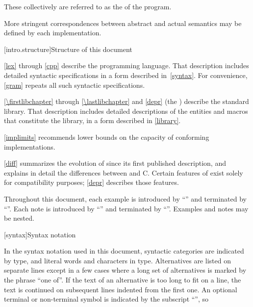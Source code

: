 These collectively are referred to as the
 of the program.
\begin{note} More stringent correspondences between abstract and actual
semantics may be defined by each implementation. \end{note}

[intro.structure]{Structure of this document}

\pnum
{}%
%
\ref{lex} through \ref{cpp} describe the \Cpp{} programming
language. That description includes detailed syntactic specifications in
a form described in~\ref{syntax}. For convenience, \ref{gram}
repeats all such syntactic specifications.

\pnum
\ref{\firstlibchapter} through \ref{\lastlibchapter} and \ref{depr}
(the ) describe the \Cpp{} standard library.
That description includes detailed descriptions of the
entities and macros
that constitute the library, in a form described in \ref{library}.

\pnum
\ref{implimits} recommends lower bounds on the capacity of conforming
implementations.

\pnum
\ref{diff} summarizes the evolution of \Cpp{} since its first
published description, and explains in detail the differences between
\Cpp{} and C\@. Certain features of \Cpp{} exist solely for compatibility
purposes; \ref{depr} describes those features.

\pnum
Throughout this document, each example is introduced by
``'' and terminated by ``''. Each note is
introduced by ``'' and terminated by ``''. Examples
and notes may be nested.%

[syntax]{Syntax notation}

\pnum
{}%
In the syntax notation used in this document, syntactic
categories are indicated by  type, and literal words
and characters in   type. Alternatives are
listed on separate lines except in a few cases where a long set of
alternatives is marked by the phrase ``one of''. If the text of an alternative is too long to fit on a line, the text is continued on subsequent lines indented from the first one.
An optional terminal or non-terminal symbol is indicated by the subscript
``\opt{\relax}'', so

\begin{ncbnf}
\terminal{\{}  \terminal{\}}
\end{ncbnf}

